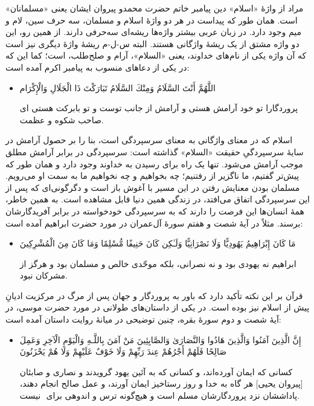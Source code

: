 مراد از واژهٔ «اسلام» دین پیامبر خاتم حضرت محمد{}و پیروان ایشان یعنی «مسلمانان» است. همان طور که پیداست در هر دو واژهٔ‌ اسلام و مسلمان، سه حرف سین، لام و میم وجود دارد. در زبان عربی بیشتر واژه‌ها ریشه‌ای سه‌حرفی دارند. از همین رو، این دو واژه مشتق از یک ریشهٔ واژگانی هستند. البته س-ل-م ریشهٔ واژهٔ دیگری نیز است که آن واژه یکی از نام‌های خداوند، یعنی «السلام»،  آرام و صلح‌طلب، است؛ کما این که در یکی از دعاهای منسوب به پیامبر اکرم{} آمده است:
\begin{itemize}
	\item[]
	{
		اللَّهُمَّ أَنْتَ السَّلَامُ وَمِنْكَ السَّلَامُ تَبَارَكْتَ ذَا الْجَلَالِ وَالْإِكْرَام}
	
	{ پروردگارا تو خود آرامش هستی و آرامش از جانب توست و تو بابرکت هستی ای صاحب شکوه و عظمت.}
\end{itemize}

اسلام که در معنای واژگانی به معنای سرسپردگی است، بنا را بر حصول آرامش در سایهٔ سرسپردگیِ حقیقت «السلام» گذاشته است: سرسپردگی در برابر آرامش مطلق موجب آرامش می‌شود. تنها یک راه برای رسیدن به خداوند وجود دارد و همان طور که پیش‌تر گفتیم، ما ناگزیر از رفتنیم؛ چه بخواهیم و چه نخواهیم ما به سمت او می‌رویم. مسلمان بودن معنایش رفتن در این مسیر با آغوش باز است و دگرگونی‌ای که پس از این سرسپردگی اتفاق می‌افتد، در زندگی همین دنیا قابل مشاهده است. به همین خاطر، همهٔ انسان‌ها این فرصت را دارند که به سرسپردگی خودخواسته در برابر آفریدگارشان برسند. مثلاً در آیهٔ شصت و هفتم سورهٔ آل‌عمران در مورد حضرت ابراهیم{} آمده است:
\begin{itemize}
	\item[]
	{
		مَا كَانَ إِبْرَاهِيمُ يَهُودِيًّا وَلَا نَصْرَانِيًّا وَلَـٰكِن كَانَ حَنِيفًا مُّسْلِمًا وَمَا كَانَ مِنَ الْمُشْرِكِينَ}
	
	{ ابراهیم نه یهودی بود و نه نصرانی، بلکه موحّدی خالص و مسلمان بود و هرگز از مشرکان نبود.}
\end{itemize}

قرآن بر این نکته تأکید دارد که باور به پروردگار و جهان پس از مرگ در مرکزیت ادیانِ پیش از اسلام نیز بوده است. در یکی از داستان‌های طولانی در مورد حضرت موسی{}، در آیهٔ شصت و دوم سورهٔ بقره، چنین توضیحی در میانهٔ روایت داستان آمده است:


\begin{itemize}
	\item[]
	{
		إِنَّ الَّذِينَ آمَنُوا وَالَّذِينَ هَادُوا وَالنَّصَارَىٰ وَالصَّابِئِينَ مَنْ آمَنَ بِاللَّـهِ وَالْيَوْمِ الْآخِرِ وَعَمِلَ صَالِحًا فَلَهُمْ أَجْرُهُمْ عِندَ رَبِّهِمْ وَلَا خَوْفٌ عَلَيْهِمْ وَلَا هُمْ يَحْزَنُونَ}
	
	{
		کسانی که ایمان آورده‌اند، و کسانی که به آئین یهود گرویدند و نصاری و صابئان [پیروان یحیی‌] هر گاه به خدا و روز رستاخیز ایمان آورند، و عمل صالح انجام دهند، پاداششان نزد پروردگارشان مسلم است و هیچ‌گونه ترس و اندوهی برای ‌ نیست.}
\end{itemize}


